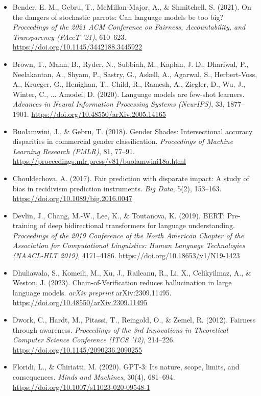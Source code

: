 \begin{itemize}[leftmargin=1.5em, label={}, itemsep=0.08ex, parsep=0pt]
\small\raggedright
{}
    \item Bender, E. M., Gebru, T., McMillan-Major, A., \& Shmitchell, S. (2021). On the dangers of stochastic parrots: Can language models be too big? \textit{Proceedings of the 2021 ACM Conference on Fairness, Accountability, and Transparency (FAccT '21)}, 610--623. \url{https://doi.org/10.1145/3442188.3445922}
    \item Brown, T., Mann, B., Ryder, N., Subbiah, M., Kaplan, J. D., Dhariwal, P., Neelakantan, A., Shyam, P., Sastry, G., Askell, A., Agarwal, S., Herbert-Voss, A., Krueger, G., Henighan, T., Child, R., Ramesh, A., Ziegler, D., Wu, J., Winter, C., ... Amodei, D. (2020). Language models are few-shot learners. \textit{Advances in Neural Information Processing Systems (NeurIPS)}, 33, 1877--1901. \url{https://doi.org/10.48550/arXiv.2005.14165}
    \item Buolamwini, J., \& Gebru, T. (2018). Gender Shades: Intersectional accuracy disparities in commercial gender classification. \textit{Proceedings of Machine Learning Research (PMLR)}, 81, 77--91. \url{https://proceedings.mlr.press/v81/buolamwini18a.html}
    \item Chouldechova, A. (2017). Fair prediction with disparate impact: A study of bias in recidivism prediction instruments. \textit{Big Data}, 5(2), 153--163. \url{https://doi.org/10.1089/big.2016.0047}
    \item Devlin, J., Chang, M.-W., Lee, K., \& Toutanova, K. (2019). BERT: Pre-training of deep bidirectional transformers for language understanding. \textit{Proceedings of the 2019 Conference of the North American Chapter of the Association for Computational Linguistics: Human Language Technologies (NAACL-HLT 2019)}, 4171--4186. \url{https://doi.org/10.18653/v1/N19-1423}
    \item Dhuliawala, S., Komeili, M., Xu, J., Raileanu, R., Li, X., Celikyilmaz, A., \& Weston, J. (2023). Chain-of-Verification reduces hallucination in large language models. \textit{arXiv preprint} arXiv:2309.11495. \url{https://doi.org/10.48550/arXiv.2309.11495}
    \item Dwork, C., Hardt, M., Pitassi, T., Reingold, O., \& Zemel, R. (2012). Fairness through awareness. \textit{Proceedings of the 3rd Innovations in Theoretical Computer Science Conference (ITCS '12)}, 214--226. \url{https://doi.org/10.1145/2090236.2090255}
    \item Floridi, L., \& Chiriatti, M. (2020). GPT-3: Its nature, scope, limits, and consequences. \textit{Minds and Machines}, 30(4), 681--694. \url{https://doi.org/10.1007/s11023-020-09548-1}

\end{itemize}
